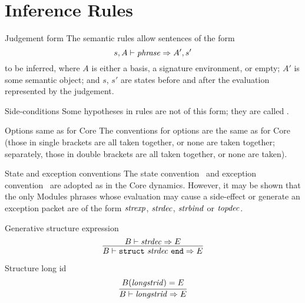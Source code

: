 \section{Inference Rules}

\begin{definition}{Judgement form}
The semantic rules allow sentences  of the form
\begin{equation*}
s,A\vdash\textit{phrase\/}\Rightarrow A',s'
\end{equation*}
to be inferred, where $A$ is either a basis, a signature environment, or
empty; $A'$ is some semantic object; and $s$, $s'$ are states before and
after the evaluation represented by the judgement.
\end{definition}

\begin{definition}{Side-conditions}
Some hypotheses in rules are not of this form; they are called
.
\end{definition}

\begin{convention}{Options same as for Core}
The conventions for options are the same as for Core (those in single
brackets are all taken together, or none are taken together; separately,
those in double brackets are all taken together, or none are taken).
\end{convention}

\begin{convention}{State and exception conventions}\label{convention:dynamic-modules:state-and-exception}
The state convention~ and
exception convention~ are
adopted as in the Core dynamics. However, it may be shown that the only
Modules phrases whose evaluation may cause a side-effect or generate an
exception packet are of the form $\textit{strexp\/}$, $\textit{strdec\/}$, $\textit{strbind\/}$ or
$\textit{topdec\/}$.
\end{convention}


\begin{inference-rule}{Generative structure expression}
\begin{equation}\label{rule:dynamic-modules:generative-structure-expression}
\vcenter{\infer{\B\ts\encstrexp\ra\E}
  {\B\ts\strdec\ra\E}}
\end{equation}
\end{inference-rule}

\begin{inference-rule}{Structure long id}
\begin{equation}\label{rule:dynamic-modules:longstrid}
\vcenter{\infer{\B\ts\longstrid\ra\E}
  {\B(\longstrid)=\E}}
\end{equation}
\end{inference-rule}

